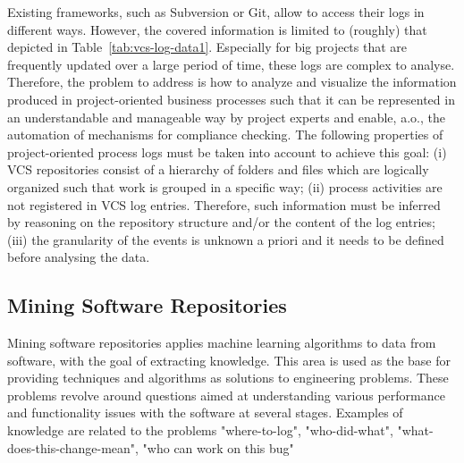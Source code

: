 %			
%			


Existing frameworks, such as Subversion or Git, allow to access their logs in different ways. However, the covered information is limited to (roughly) that depicted in Table~\ref{tab:vcs-log-data1}. Especially for big projects that are frequently updated over a large period of time, these logs are complex to analyse.
Therefore, the problem to address is how to analyze and visualize the information produced in project-oriented business processes such that it can be represented in an understandable and manageable way by project experts and
enable, a.o., the automation of mechanisms for compliance checking.
The following properties of project-oriented process logs must be taken into account to achieve this goal: (i) VCS repositories consist of a hierarchy of folders and files which are logically organized such that work is grouped in a specific way; (ii) process activities are not registered in VCS log entries. Therefore, such information must be inferred by reasoning on the repository structure and/or the content of the log entries; (iii) the granularity of the events is unknown a priori and it needs to be defined before analysing the data.


\subsection{Mining Software Repositories}
\label{sec:msr}


Mining software repositories applies machine learning algorithms to data from software, with the goal of extracting knowledge. 
This area is used as the base for providing techniques and algorithms as solutions to engineering problems. These problems revolve around questions aimed at understanding various performance and functionality issues with the software at several stages. Examples of knowledge are related to the problems "where-to-log", "who-did-what", "what-does-this-change-mean", "who can work on this bug"



